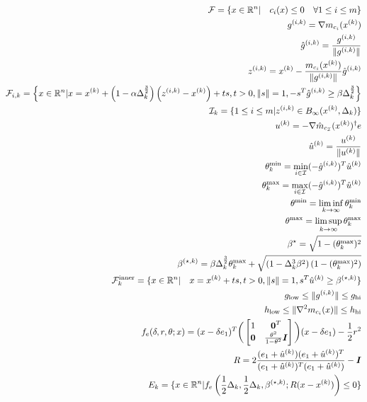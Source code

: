\begin{align*}
{\mathcal F} = \{x \in {\mathbb R^{n}} | \quad c_i(x) \le 0\quad \forall 1 \le i \le m \} \\
{g^{(i, k)}} = \nabla m_{c_i}({x^{(k)}}) \\ 
{{\hat g}^{(i, k)}} = \frac{{g^{(i, k)}}}{\|{g^{(i, k)}}\|} \\
{z^{(i, k)}} = {x^{(k)}} - \frac{m_{c_i}({x^{(k)}})}{\|{g^{(i, k)}}\|}{{\hat g}^{(i, k)}} \\
{\mathcal F_{i, k}} = \left\{x \in {\mathbb R^{n}} | x = {x^{(k)}} + \left(1 - \alpha\Delta_k^{\frac 3 2}\right)\left({z^{(i, k)}} - {x^{(k)}}\right) + t s,t > 0, \|s\| = 1, -s^T{{\hat g}^{(i, k)}} \ge \beta \Delta_k^{\frac 3 2 }\right\} \\
{\mathcal I_{k}} = \{1\le i \le m | {z^{(i, k)}} \in B_{\infty}({x^{(k)}}, \Delta_k) \} \\
{u^{(k)}} = -\nabla \hat m_{c_{\mathcal I}}({x^{(k)}})^{\dagger} e\\
{{\hat u}^{(k)}} = \frac {{u^{(k)}}} {\| {u^{(k)}}\|}\\
\theta^{\text{min}}_k = \min_{i \in \mathcal I} (-{{\hat g}^{(i, k)}})^T {{\hat u}^{(k)}} \\
\theta^{\text{max}}_k = \max_{i \in \mathcal I} (-{{\hat g}^{(i, k)}})^T {{\hat u}^{(k)}} \\
\theta^{\text{min}} = \liminf_{k\to\infty} \theta^{\text{min}}_k\\
\theta^{\text{max}} = \limsup_{k\to\infty} \theta^{\text{max}}_k\\
{\beta^{\star}} = \sqrt{ 1 - (\theta^{\text{max}}_k)^2}\\
{\beta^{(\star, k)}} = \beta\Delta_k^{\frac 3 2} \theta^{\text{max}}_k + \sqrt{(1 - \Delta_k^3\beta^2)\left(1 - (\theta^{\text{max}}_k) ^2\right)} \\
{\mathcal {F}^{\text{inner}}_k} = \{x \in {\mathbb R^{n}} | \quad x = {x^{(k)}} + ts, t > 0, \|s\| = 1, s^T{{\hat u}^{(k)}} \ge {\beta^{(\star, k)}} \} \\
g_{\text{low}} \le \|{g^{(i, k)}}\| \le g_{\text{hi}} \\
h_{\text{low}} \le \|\nabla^2m_{c_i}(x)\| \le h_{\text{hi}} \\
f_e(\delta, r, \theta; x) = (x - \delta e_1)^T\bigg(\begin{bmatrix}
1 & \boldsymbol0^T \\
\boldsymbol 0 & \frac{\theta^2}{1 - \theta^2} \boldsymbol I \\
\end{bmatrix}\bigg)(x - \delta e_1) - \frac 1 2 r^2 \\
R = 2\frac{(e_1 + {{\hat u}^{(k)}})(e_1 + {{\hat u}^{(k)}})^T}{(e_1 + {{\hat u}^{(k)}})^T(e_1 + {{\hat u}^{(k)}})} - \boldsymbol I \\
E_k = \{x \in {\mathbb R^{n}} | f_e\left(\frac 1 2 \Delta_k, \frac 1 2 \Delta_k, {\beta^{(\star, k)}}; R(x - {x^{(k)}})\right) \le 0\}
\end{align*}



